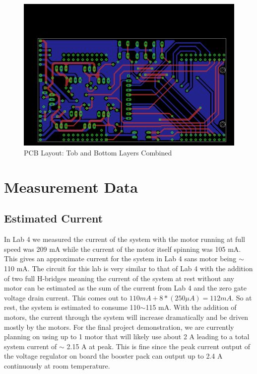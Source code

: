 \documentclass{article}
\begin{document}
	\begin{figure}[h]
		\includegraphics[keepaspectratio, width = \textwidth]{lab7Graphics/PCB_Combined}
		\caption{PCB Layout: Tob and Bottom Layers Combined}
		\label{fig:PCB_Combined}
	\end{figure}
	


\section{Measurement Data}
	\subsection{Estimated Current}
		In Lab 4 we measured the current of the system with the motor running at full speed was 209 mA while the current of the motor itself spinning was 105 mA. This gives an approximate current for the system in Lab 4 sans motor being $\sim$110 mA. The circuit for this lab is very similar to that of Lab 4 with the addition of two full H-bridges meaning the current of the system at rest without any motor can be estimated as the sum of the current from Lab 4 and the zero gate voltage drain current. This comes out to $110 mA + 8*(250 \mu A) = 112 mA$. So at rest, the system is estimated to consume 110$\sim$115 mA. With the addition of motors, the current through the system will increase dramatically and be driven mostly by the motors. For the final project demonstration, we are currently planning on using up to 1 motor that will likely use about 2 A leading to a total system current of $\sim$ 2.15 A at peak. This is fine since the peak current output of the voltage regulator on board the booster pack can output up to 2.4 A continuously at room temperature.
	
\end{document}
